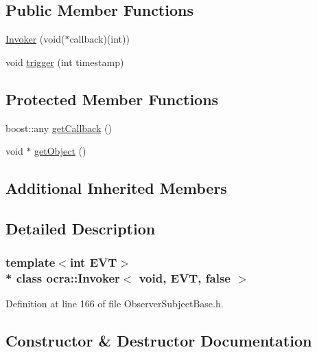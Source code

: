 \subsection*{Public Member Functions}
\begin{DoxyCompactItemize}
\item 
\hyperlink{classocra_1_1Invoker_3_01void_00_01EVT_00_01false_01_4_adbb4357c33d4e320a3a21916fd76fd80}{Invoker} (void($\ast$callback)(int))
\item 
void \hyperlink{classocra_1_1Invoker_3_01void_00_01EVT_00_01false_01_4_a483d45eb6e668e5c97b9861840f4d6ea}{trigger} (int timestamp)
\end{DoxyCompactItemize}
\subsection*{Protected Member Functions}
\begin{DoxyCompactItemize}
\item 
boost\+::any \hyperlink{classocra_1_1Invoker_3_01void_00_01EVT_00_01false_01_4_a28f6e1841ccdb09d1bfefbb529d51f79}{get\+Callback} ()
\item 
void $\ast$ \hyperlink{classocra_1_1Invoker_3_01void_00_01EVT_00_01false_01_4_a2d32f4dcaca9ae526b89e28cf2a3fc70}{get\+Object} ()
\end{DoxyCompactItemize}
\subsection*{Additional Inherited Members}


\subsection{Detailed Description}
\subsubsection*{template$<$int E\+VT$>$\\*
class ocra\+::\+Invoker$<$ void, E\+V\+T, false $>$}



Definition at line 166 of file Observer\+Subject\+Base.\+h.



\subsection{Constructor \& Destructor Documentation}
